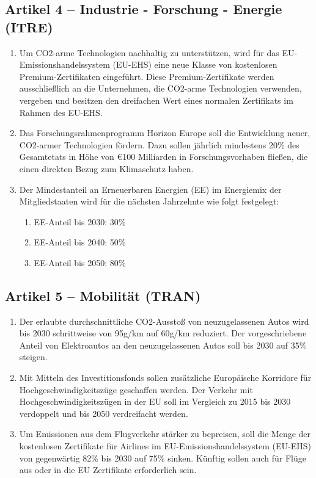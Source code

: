 \documentclass[12pt,a4paper]{article}
\begin{document}
\subsection*{Artikel 4 – Industrie - Forschung - Energie (ITRE)}

\begin{enumerate}[leftmargin=2em, itemsep=2pt]
  \item Um CO2-arme Technologien nachhaltig zu unterstützen, wird für das EU-Emissionshandelssystem (EU-EHS) eine neue Klasse von kostenlosen Premium-Zertifikaten eingeführt. Diese Premium-Zertifikate werden ausschließlich an die Unternehmen, die CO2-arme Technologien verwenden, vergeben und besitzen den dreifachen Wert eines normalen Zertifikats im Rahmen des EU-EHS.
  \item Das Forschungsrahmenprogramm Horizon Europe soll die Entwicklung neuer, CO2-armer Technologien fördern. Dazu sollen jährlich mindestens 20\% des Gesamtetats in Höhe von \euro{}100 Milliarden in Forschungsvorhaben fließen, die einen direkten Bezug zum Klimaschutz haben.
  \item Der Mindestanteil an Erneuerbaren Energien (EE) im Energiemix der Mitgliedstaaten wird für die nächsten Jahrzehnte wie folgt festgelegt:
  \begin{enumerate}[label=\alph*., leftmargin=1.8em, itemsep=2pt]
    \item EE-Anteil bis 2030: 30\%
    \item EE-Anteil bis 2040: 50\%
    \item EE-Anteil bis 2050: 80\%
  \end{enumerate}
\end{enumerate}

\subsection*{Artikel 5 – Mobilität (TRAN)}

\begin{enumerate}[leftmargin=2em, itemsep=2pt]
  \item Der erlaubte durchschnittliche CO2-Ausstoß von neuzugelassenen Autos wird bis 2030 schrittweise von 95g/km auf 60g/km reduziert. Der vorgeschriebene Anteil von Elektroautos an den neuzugelassenen Autos soll bis 2030 auf 35\% steigen.
  \item Mit Mitteln des Investitionsfonds sollen zusätzliche Europäische Korridore für Hochgeschwindigkeitszüge geschaffen werden. Der Verkehr mit Hochgeschwindigkeitszügen in der EU soll im Vergleich zu 2015 bis 2030 verdoppelt und bis 2050 verdreifacht werden.
  \item Um Emissionen aus dem Flugverkehr stärker zu bepreisen, soll die Menge der kostenlosen Zertifikate für Airlines im EU-Emissionshandelssystem (EU-EHS) von gegenwärtig 82\% bis 2030 auf 75\% sinken. Künftig sollen auch für Flüge aus oder in die EU Zertifikate erforderlich sein.
\end{enumerate}
\end{document}
